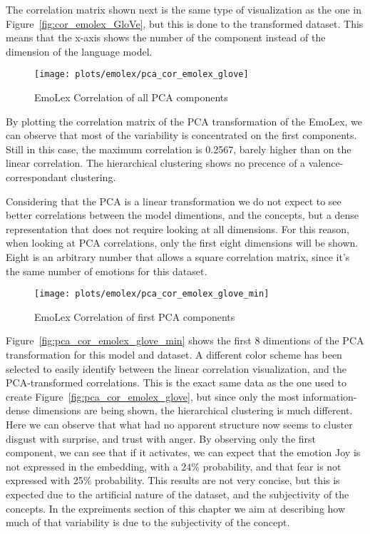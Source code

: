 The correlation matrix shown next is the same type of visualization as the one in Figure~\ref{fig:cor_emolex_GloVe}, but this is done to the transformed dataset. This means that the x-axis shows the number of the component instead of the dimension of the language model.

\begin{figure}[H]
  \texttt{[image: plots/emolex/pca\_cor\_emolex\_glove]}
  \centering
  \caption{EmoLex Correlation of all PCA components}
\end{figure}\label{fig:pca_cor_emolex_glove}

By plotting the correlation matrix of the PCA transformation of the EmoLex, we can observe that most of the variability is concentrated on the first components. Still in this case, the maximum correlation is 0.2567, barely higher than on the linear correlation. The hierarchical clustering shows no precence of a valence-correspondant clustering.

Considering that the PCA is a linear transformation we do not expect to see better correlations between the model dimentions, and the concepts, but a dense representation that does not require looking at all dimensions. For this reason, when looking at PCA correlations, only the first eight dimensions will be shown. Eight is an arbitrary number that allows a square correlation matrix, since it's the same number of emotions for this dataset.

\begin{figure}[H]
  \texttt{[image: plots/emolex/pca\_cor\_emolex\_glove\_min]}
  \centering
  \caption{EmoLex Correlation of first PCA components}
\end{figure}\label{fig:pca_cor_emolex_glove_min}

Figure~\ref{fig:pca_cor_emolex_glove_min} shows the first 8 dimentions of the PCA transformation for this model and dataset. A different color scheme has been selected to easily identify between the linear correlation visualization, and the PCA-transformed correlations. This is the exact same data as the one used to create Figure~\ref{fig:pca_cor_emolex_glove}, but since only the most information-dense dimensions are being shown, the hierarchical clustering is much different. Here we can observe that what had no apparent structure now seems to cluster disgust with surprise, and trust with anger. By observing only the first component, we can see that if it activates, we can expect that the emotion Joy is not expressed in the embedding, with a 24\% probability, and that fear is not expressed with 25\% probability. This results are not very concise, but this is expected due to the artificial nature of the dataset, and the subjectivity of the concepts. In the expreiments section of this chapter we aim at describing how much of that variability is due to the subjectivity of the concept.

